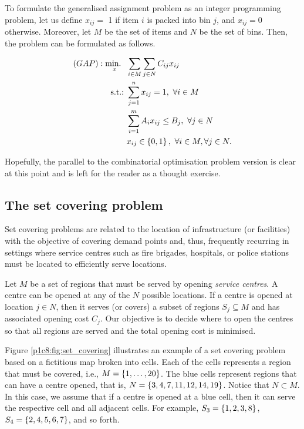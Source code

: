 To formulate the generalised assignment problem as an integer programming problem, let us define $x_{ij} =$ 1 if item $i$ is packed into bin $j$, and $x_{ij} = 0$ otherwise. Moreover, let $M$ be the set of items and $N$ be the set of bins. Then, the problem can be formulated as follows.

\begin{align*}
	(GAP) : \mathop{\text{min.~}}_x \ & \sum_{i \in M}\sum_{j \in N} C_{ij}x_{ij} \\
	\mathop{\text{s.t.:~}} & \sum_{j=1}^n x_{ij} = 1, \ \forall i \in M\\
	  & \sum_{i=1}^m A_{i}x_{ij} \leq B_j, \ \forall j \in N\\
	  & x_{ij} \in \left\{ 0,1 \right \}, \ \forall i \in M, \forall j \in N. 
\end{align*} 

Hopefully, the parallel to the combinatorial optimisation problem version is clear at this point and is left for the reader as a thought exercise. 


\subsection{The set covering problem}

Set covering problems are related to the location of infrastructure (or facilities) with the objective of covering demand points and, thus, frequently recurring in settings where service centres such as fire brigades, hospitals, or police stations must be located to efficiently serve locations.

Let $M$ be a set of regions that must be served by opening \emph{service centres}. A centre can be opened at any of the $N$ possible locations. If a centre is opened at location $j \in N$, then it serves (or covers) a subset of regions $S_j \subseteq M$ and has associated opening cost $C_j$. Our objective is to decide where to open the centres so that all regions are served and the total opening cost is minimised. 

Figure \ref{p1c8:fig:set_covering} illustrates an example of a set covering problem based on a fictitious map broken into cells. Each of the cells represents a region that must be covered, i.e., $M = \left\{ 1,\dots, 20 \right \}$. The blue cells represent regions that can have a centre opened, that is, $N = \left\{ 3,4,7,11,12,14,19 \right \}$. Notice that $N \subset M$. In this case, we assume that if a centre is opened at a blue cell, then it can serve the respective cell and all adjacent cells. For example, $S_3 = \left\{ 1,2,3,8 \right \}$, $S_4=\left\{ 2,4,5,6,7 \right \}$, and so forth.

